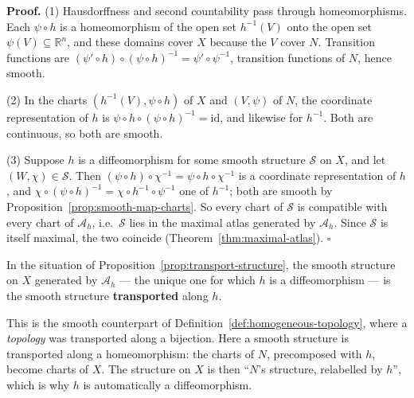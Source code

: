 \documentclass[11pt]{report}
\makeatletter
\newcounter{defcounter}[section]
\renewenvironment{proof}[1][Proof]{\noindent\textbf{#1.} }{\hfill$\square$\par\vspace{5pt}}
\newcommand{\deflabel}[1]{\edef\@currentlabel{\arabic{section}.\arabic{defcounter}}\label{#1}}
\newcommand{\leeref}[1]{\par\smallskip{\raggedleft\footnotesize\textsc{Lee}:\ #1\par}}
\makeatother
\begin{document}
\begin{proof}
(1) Hausdorffness and second countability pass through homeomorphisms. Each $\psi \circ h$ is a homeomorphism of the open set $h^{-1}(V)$ onto the open set $\psi(V) \subseteq \mathbb{R}^n$, and these domains cover $X$ because the $V$ cover $N$. Transition functions are $(\psi' \circ h) \circ (\psi \circ h)^{-1} = \psi' \circ \psi^{-1}$, transition functions of $N$, hence smooth.

(2) In the charts $(h^{-1}(V), \psi \circ h)$ of $X$ and $(V, \psi)$ of $N$, the coordinate representation of $h$ is $\psi \circ h \circ (\psi \circ h)^{-1} = \mathrm{id}$, and likewise for $h^{-1}$. Both are continuous, so both are smooth.

(3) Suppose $h$ is a diffeomorphism for some smooth structure $\mathcal{S}$ on $X$, and let $(W, \chi) \in \mathcal{S}$. Then $(\psi \circ h) \circ \chi^{-1} = \psi \circ h \circ \chi^{-1}$ is a coordinate representation of $h$, and $\chi \circ (\psi \circ h)^{-1} = \chi \circ h^{-1} \circ \psi^{-1}$ one of $h^{-1}$; both are smooth by Proposition~\ref{prop:smooth-map-charts}. So every chart of $\mathcal{S}$ is compatible with every chart of $\mathcal{A}_h$, i.e.\ $\mathcal{S}$ lies in the maximal atlas generated by $\mathcal{A}_h$. Since $\mathcal{S}$ is itself maximal, the two coincide (Theorem~\ref{thm:maximal-atlas}).
\end{proof}

\begin{defbox}\deflabel{def:transported}
In the situation of Proposition~\ref{prop:transport-structure}, the smooth structure on $X$ generated by $\mathcal{A}_h$ --- the unique one for which $h$ is a diffeomorphism --- is the smooth structure \textbf{transported} along $h$.
\leeref{cf.\ Problem 1-6}
\end{defbox}

\begin{rembox}\label{rem:smooth-structures-12}
This is the smooth counterpart of Definition~\ref{def:homogeneous-topology}, where a \emph{topology} was transported along a bijection. Here a smooth structure is transported along a homeomorphism: the charts of $N$, precomposed with $h$, become charts of $X$. The structure on $X$ is then ``$N$'s structure, relabelled by $h$'', which is why $h$ is automatically a diffeomorphism.
\end{rembox}
\end{document}
